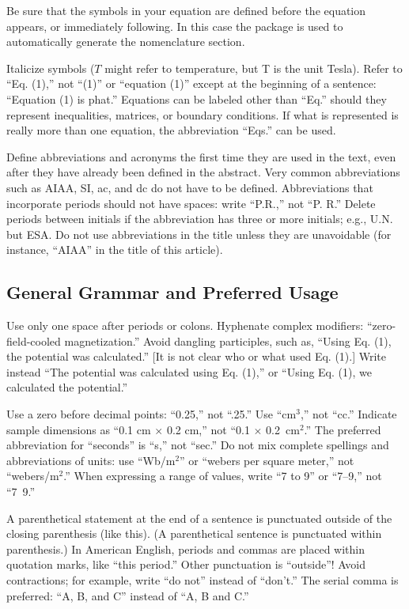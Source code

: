 Be sure that the symbols in your equation are defined before the
equation appears, or immediately following.
In this case the  package is used to automatically generate
the nomenclature section.

Italicize symbols ($T$ might refer to temperature, but T is the unit
Tesla).
Refer to ``Eq. (1),'' not ``(1)'' or ``equation (1)'' except at the
beginning of a sentence: ``Equation (1) is phat.''
Equations can be labeled other than ``Eq.'' should they represent
inequalities, matrices, or boundary conditions.
If what is represented is really more than one equation, the
abbreviation ``Eqs.'' can be used.

Define abbreviations and acronyms the first time they are used in the
text, even after they have already been defined in the abstract.
Very common abbreviations such as AIAA, SI, ac, and dc do not have to be
defined.
Abbreviations that incorporate periods should not have spaces: write
``P.R.,'' not ``P. R.''
Delete periods between initials if the abbreviation has three or more
initials; e.g., U.N. but ESA.\@
Do not use abbreviations in the title unless they are unavoidable (for
instance, ``AIAA'' in the title of this article).

\subsection{General Grammar and Preferred Usage}

Use only one space after periods or colons. Hyphenate complex
modifiers: ``zero-field-cooled magnetization.''
Avoid dangling participles, such as, ``Using Eq. (1), the potential was
calculated.''
[It is not clear who or what used Eq. (1).]
Write instead ``The potential was calculated using Eq. (1),'' or ``Using
Eq. (1), we calculated the potential.''

Use a zero before decimal points: ``0.25,'' not ``.25.''
Use ``cm$^3$,'' not ``cc.''
Indicate sample dimensions as ``0.1 cm $\times$ 0.2 cm,'' not ``0.1
$\times$ 0.2~cm$^2$.''
The preferred abbreviation for ``seconds'' is ``s,'' not ``sec.''
Do not mix complete spellings and abbreviations of units: use
``Wb/m$^2$'' or ``webers per square meter,'' not ``webers/m$^2$.''
When expressing a range of values, write ``7 to 9'' or ``7--9,'' not
``7~9.''

A parenthetical statement at the end of a sentence is punctuated
outside of the closing parenthesis (like this).
(A parenthetical sentence is punctuated within parenthesis.)
In American English, periods and commas are placed within quotation
marks, like ``this period.''
Other punctuation is ``outside''! Avoid contractions; for example, write
``do not'' instead of ``don't.''
The serial comma is preferred: ``A, B, and C'' instead of ``A, B and C.''

